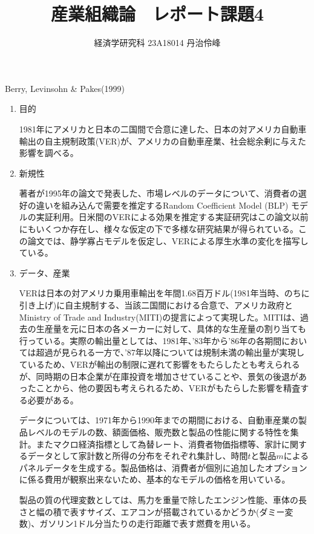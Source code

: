 \documentclass{jsarticle}
\begin{document}
\title{産業組織論　レポート課題4}
\author{経済学研究科 23A18014 丹治伶峰}
\date{}
\maketitle

Berry, Levinsohn \& Pakes(1999)

\begin{enumerate}

\item 目的

1981年にアメリカと日本の二国間で合意に達した、日本の対アメリカ自動車輸出の自主規制政策(VER)が、アメリカの自動車産業、社会総余剰に与えた影響を調べる。

\item 新規性

著者が1995年の論文で発表した、市場レベルのデータについて、消費者の選好の違いを組み込んで需要を推定するRandom Coefficient Model (BLP) モデルの実証利用。日米間のVERによる効果を推定する実証研究はこの論文以前にもいくつか存在し、様々な仮定の下で多様な研究結果が得られている。この論文では、静学寡占モデルを仮定し、VERによる厚生水準の変化を描写している。

\item データ、産業

VERは日本の対アメリカ乗用車輸出を年間1.68百万ドル(1981年当時、のちに引き上げ)に自主規制する、当該二国間における合意で、アメリカ政府とMinistry of Trade and Industry(MITI)の提言によって実現した。MITIは、過去の生産量を元に日本の各メーカーに対して、具体的な生産量の割り当ても行っている。実際の輸出量としては、1981年、'83年から'86年の各期間においては超過が見られる一方で、'87年以降については規制未満の輸出量が実現しているため、VERが輸出の制限に遅れて影響をもたらしたとも考えられるが、同時期の日本企業が在庫投資を増加させていることや、景気の後退があったことから、他の要因も考えられるため、VERがもたらした影響を精査する必要がある。

\vspace{1zw}

データについては、1971年から1990年までの期間における、自動車産業の製品レベルのモデルの数、額面価格、販売数と製品の性能に関する特性を集計。またマクロ経済指標として為替レート、消費者物価指標等、家計に関するデータとして家計数と所得の分布をそれぞれ集計し、時間$t$と製品$m$によるパネルデータを生成する。製品価格は、消費者が個別に追加したオプションに係る費用が観察出来ないため、基本的なモデルの価格を用いている。

製品の質の代理変数としては、馬力を重量で除したエンジン性能、車体の長さと幅の積で表すサイズ、エアコンが搭載されているかどうか(ダミー変数)、ガソリン1ドル分当たりの走行距離で表す燃費を用いる。


\end{enumerate}
\end{document}
